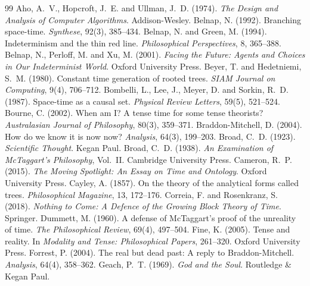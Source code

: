 \documentclass{situationist-preprint}
\begin{document}
\begin{thebibliography}{99}\small
{} Aho, A.~V., Hopcroft, J.~E. and Ullman, J.~D. (1974). \emph{The Design and Analysis of Computer Algorithms}. Addison-Wesley.
 Belnap, N. (1992). Branching space-time. \emph{Synthese}, 92(3), 385--434.
 Belnap, N. and Green, M. (1994). Indeterminism and the thin red line. \emph{Philosophical Perspectives}, 8, 365--388.
 Belnap, N., Perloff, M. and Xu, M. (2001). \emph{Facing the Future: Agents and Choices in Our Indeterminist World}. Oxford University Press.
 Beyer, T. and Hedetniemi, S.~M. (1980). Constant time generation of rooted trees. \emph{SIAM Journal on Computing}, 9(4), 706--712.
 Bombelli, L., Lee, J., Meyer, D. and Sorkin, R.~D. (1987). Space-time as a causal set. \emph{Physical Review Letters}, 59(5), 521--524.
 Bourne, C. (2002). When am I? A tense time for some tense theorists? \emph{Australasian Journal of Philosophy}, 80(3), 359--371.
 Braddon-Mitchell, D. (2004). How do we know it is now now? \emph{Analysis}, 64(3), 199--203.
 Broad, C.~D. (1923). \emph{Scientific Thought}. Kegan Paul.
 Broad, C.~D. (1938). \emph{An Examination of McTaggart's Philosophy}, Vol.~II. Cambridge University Press.
 Cameron, R.~P. (2015). \emph{The Moving Spotlight: An Essay on Time and Ontology}. Oxford University Press.
 Cayley, A. (1857). On the theory of the analytical forms called trees. \emph{Philosophical Magazine}, 13, 172--176.
 Correia, F. and Rosenkranz, S. (2018). \emph{Nothing to Come: A Defence of the Growing Block Theory of Time}. Springer.
 Dummett, M. (1960). A defense of McTaggart's proof of the unreality of time. \emph{The Philosophical Review}, 69(4), 497--504.
 Fine, K. (2005). Tense and reality. In \emph{Modality and Tense: Philosophical Papers}, 261--320. Oxford University Press.
 Forrest, P. (2004). The real but dead past: A reply to Braddon-Mitchell. \emph{Analysis}, 64(4), 358--362.
 Geach, P.~T. (1969). \emph{God and the Soul}. Routledge \& Kegan Paul.

\end{thebibliography}
\end{document}
